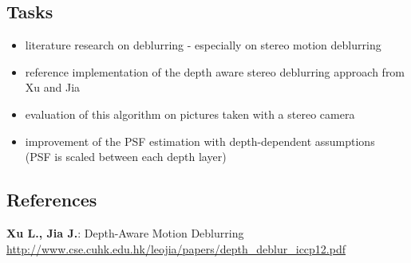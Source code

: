 \documentclass[a4paper, 12pt]{scrartcl}
\begin{document}
\subsection*{Tasks}
\begin{itemize}
\item literature research on deblurring - especially on stereo motion deblurring
\item reference implementation of the depth aware stereo deblurring approach from Xu and Jia
\item evaluation of this algorithm on pictures taken with a stereo camera
\item improvement of the PSF estimation with depth-dependent assumptions \\(PSF is scaled between each depth layer)
\end{itemize}

\subsection*{References}
\textbf{Xu L., Jia J.}: Depth-Aware Motion Deblurring \\
\url{http://www.cse.cuhk.edu.hk/leojia/papers/depth_deblur_iccp12.pdf}

\end{document}
